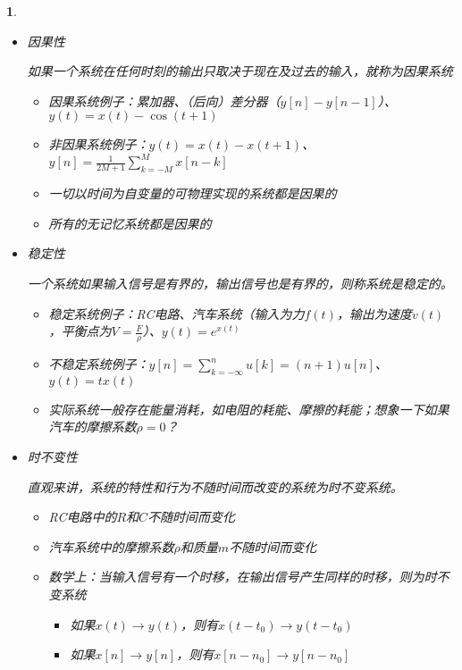 \documentclass[UTF8]{report}
\theoremstyle{MyLineTheoremStyle} %
\theoremstyle{MyBlockTheoremStyle} %
\theoremstyle{MySubsubsectionStyle} %
\newtheorem{definition}{}
\begin{document}
\begin{definition}
\begin{itemize}
        \item 因果性\par
        如果一个系统在任何时刻的输出只取决于现在及过去的输入，就称为因果系统
        \begin{itemize}
            \item 因果系统例子：累加器、（后向）差分器（$y[n] - y[n-1]$）、$y(t) = x(t) - \cos(t + 1)$
            \item 非因果系统例子：$y(t) = x(t) - x(t + 1)$、$y[n] = \frac{1}{2M+1} \sum_{k=-M}^{M} x[n - k]$
            \item 一切以时间为自变量的可物理实现的系统都是因果的
            \item 所有的无记忆系统都是因果的
        \end{itemize}

        \item 稳定性\par
        一个系统如果输入信号是有界的，输出信号也是有界的，则称系统是稳定的。
        \begin{itemize}
            \item 稳定系统例子：RC电路、汽车系统（输入为力$f(t)$，输出为速度$v(t)$，平衡点为$V = \frac{F}{\rho}$）、$y(t) = e^{x(t)}$
            \item 不稳定系统例子：$y[n] = \sum_{k=-\infty}^{n} u[k]=(n+1)u[n]$、$y(t) = t x(t)$
            \item 实际系统一般存在能量消耗，如电阻的耗能、摩擦的耗能；想象一下如果汽车的摩擦系数$\rho = 0$？
        \end{itemize}

        \item 时不变性\par
        直观来讲，系统的特性和行为不随时间而改变的系统为时不变系统。
        \begin{itemize}
            \item RC电路中的$R$和$C$不随时间而变化
            \item 汽车系统中的摩擦系数$\rho$和质量$m$不随时间而变化
            \item 数学上：当输入信号有一个时移，在输出信号产生同样的时移，则为时不变系统
            \begin{itemize}
                \item 如果$x(t) \rightarrow y(t)$，则有$x(t - t_0) \rightarrow y(t - t_0)$
                \item 如果$x[n] \rightarrow y[n]$，则有$x[n - n_0] \rightarrow y[n - n_0]$
            \end{itemize}
        \end{itemize}


\end{itemize}
\end{definition}
\end{document}
